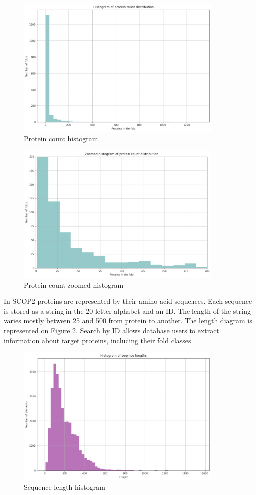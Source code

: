 \documentclass[12pt, twoside]{article}
\begin{document}
\begin{figure}[htp]
    \centering
    \includegraphics[width=10cm]{figures/figure2.pdf}
    \caption{Protein count histogram}
\end{figure}

\begin{figure}[htp]
    \centering
    \includegraphics[width=10cm]{figures/figure3.pdf}
    \caption{Protein count zoomed histogram}
\end{figure}

In SCOP2 proteins are represented by their amino acid sequences. Each sequence is stored as a string in the 20 letter alphabet and an ID. The length of the string varies mostly between 25 and 500 from protein to another. The length diagram is represented on Figure 2. Search by ID allows database users to extract information about target proteins, including their fold classes. 

\begin{figure}[htp]
    \centering
    \includegraphics[width=10cm]{figures/figure4.pdf}
    \caption{Sequence length histogram}
\end{figure}
\end{document}
